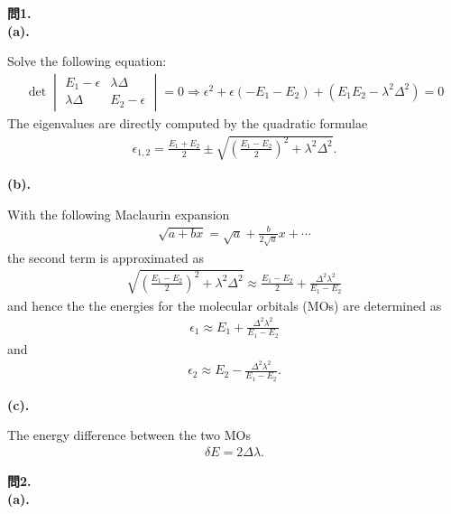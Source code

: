 \documentclass{jlreq}
\begin{document}
\noindent
\textbf{問1.}\\


\noindent
\textbf{(a).}

Solve the following equation:
\begin{eqnarray}
    \det
    \begin{vmatrix}
        E_1-\epsilon & \lambda\Delta \\
        \lambda\Delta & E_2-\epsilon 
    \end{vmatrix}=0\Rightarrow \epsilon^2+\epsilon(-E_1-E_2)+(E_1E_2-\lambda^2\Delta^2)=0   
\end{eqnarray}  
The eigenvalues are directly computed by the quadratic formulae
\begin{eqnarray}
    \epsilon_{1,2}=\frac{E_1+E_2}{2}\pm\sqrt{\left(\frac{E_1-E_2}{2}\right)^2+\lambda^2\Delta^2}.
\end{eqnarray}  

\noindent
\textbf{(b).}

With the following Maclaurin expansion
\begin{eqnarray}
    \sqrt{a+bx}=\sqrt{a}+\frac{b}{2\sqrt{a}}x+\cdots
\end{eqnarray}  
the second term is approximated as
\begin{eqnarray}
    \sqrt{\left(\frac{E_1-E_2}{2}\right)^2+\lambda^2\Delta^2}\approx\frac{E_1-E_2}{2}+\frac{\Delta^2\lambda^2}{E_1-E_2}
\end{eqnarray}
and hence the the energies for the molecular orbitals (MOs) are determined as
\begin{eqnarray}
    \epsilon_1\approx E_1+\frac{\Delta^2\lambda^2}{E_1-E_2}
\end{eqnarray}
and
\begin{eqnarray}
    \epsilon_2\approx E_2-\frac{\Delta^2\lambda^2}{E_1-E_2}.
\end{eqnarray}

\noindent
\textbf{(c).}

The energy difference between the two MOs 
\begin{eqnarray}
\delta E=2\Delta\lambda.
\end{eqnarray}

\clearpage

\noindent
\textbf{問2.}\\

\noindent
\textbf{(a).} 
\end{document}

